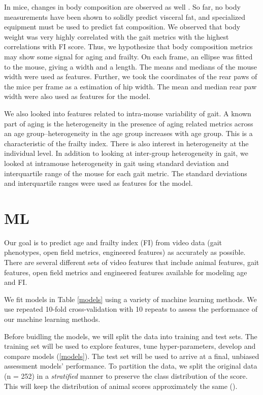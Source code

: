 \documentclass[11pt]{amsart}
\begin{document}
In mice, changes in body composition are observed as well \citep{pappas2019translation}. So far, no body measurements have been shown to solidly predict visceral fat, and specialized equipment must be used to predict fat composition. We observed that body weight was very highly correlated with the gait metrics with the highest correlations with FI score. Thus, we hypothesize that body composition metrics may show some signal for aging and frailty. On each frame, an ellipse was fitted to the mouse, giving a width and a length. The means and medians of the mouse width were used as features. Further, we took the coordinates of the rear paws of the mice per frame as a estimation of hip width. The mean and median rear paw width were also used as features for the model.

  We also looked into features related to intra-mouse variability of gait. A known part of aging is the heterogeneity in the presence of aging related metrics across an age group--heterogeneity in the age group increases with age group. This is a characteristic of the frailty index. There is also interest in heterogeneity at the individual level. In addition to looking at inter-group heterogeneity in gait, we looked at intramouse heterogeneity in gait using standard deviation and interquartile range of the mouse for each gait metric. The standard deviations and interquartile ranges were used as features for the model.






\section{ML}
Our goal is to predict age and frailty index (FI) from video data (gait phenotypes, open field metrics, engineered features) as accurately as possible. There are several different sets of video features that include animal features, gait features, open field metrics and engineered features available for modeling age and FI. 

We fit models in Table \ref{models} using a variety of machine learning methods. We use repeated 10-fold cross-validation with 10 repeats to assess the performance of our machine learning methods. 


Before buidling the models, we will split the data into training and test sets. The training set will be used to explore features, tune hyper-parameters, develop and compare models (\ref{models}). The test set will be used to arrive at a final, unbiased assessment models' performance. To partition the data, we split the original data (n = 252) in a {\textit{stratified}} manner to preserve the class distribution of the score. This will keep the distribution of animal scores approximately the same (). 
\end{document}
